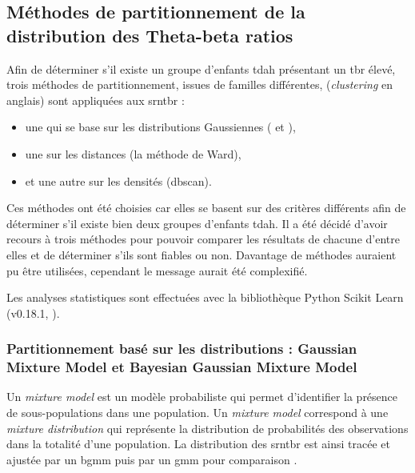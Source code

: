 \subsection{Méthodes de partitionnement de la distribution des Theta-beta ratios} \label{clustering}

Afin de déterminer s'il existe un groupe d'enfants \gls{tdah} présentant un \gls{tbr} élevé, trois méthodes de partitionnement, issues de familles différentes,
(\textit{clustering} en anglais) sont appliquées aux \gls{srntbr} : 
\begin{itemize}
\item une qui se base sur les distributions Gaussiennes ( et ), 
\item une sur les distances (la méthode de Ward),
\item et une autre sur les densités (\gls{dbscan}). 
\end{itemize}

Ces méthodes ont été choisies car elles se basent sur des critères différents afin de déterminer s'il existe bien deux groupes d'enfants \gls{tdah}. Il a été décidé
d'avoir recours à trois méthodes pour pouvoir comparer les résultats de chacune d'entre elles et de déterminer s'ils sont fiables ou non. Davantage de méthodes auraient pu
être utilisées, cependant le message aurait été complexifié.   

Les analyses statistiques sont effectuées avec la bibliothèque Python Scikit Learn (v0.18.1, \citet{Pedregosa2011}).

\subsubsection{Partitionnement basé sur les distributions : Gaussian Mixture Model et Bayesian Gaussian Mixture Model} 
Un \textit{mixture model} est un modèle probabiliste qui permet d'identifier la présence de sous-populations dans une population. Un \textit{mixture model}
correspond à une \textit{mixture distribution} qui représente la distribution de probabilités des observations dans la totalité d'une population.
La distribution des \gls{srntbr} est ainsi tracée et ajustée par un \gls{bgmm} puis par un \gls{gmm} pour comparaison \citep{Attias2000, Blei2006}. 

